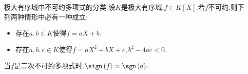 \begin{proposition}{极大有序域中不可约多项式的分类}{}
	设$K$是极大有序域,$f\in K\left[X\right]$.若$f$不可约,则下列两种情形中必有一种成立:
	\begin{itemize}
		\item 存在$a,b\in K$使得$f=aX+b$.
		\item 存在$a,b,c\in K$使得$f=aX^{2}+bX+c,b^{2}-4ac<0$.
	\end{itemize}
\end{proposition}

\begin{remark}{}{}
	当$f$是二次不可约多项式时,$\sign\left(f\right)=\sgn\left(a\right)$.
\end{remark}